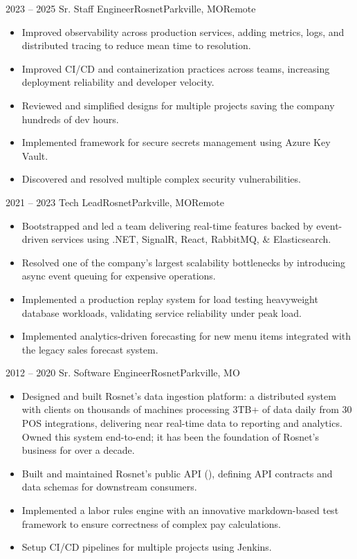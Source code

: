 \documentclass[11pt,letterpaper,final]{moderncv}
\begin{document}
	\cventry
{2023 -- 2025} {Sr. Staff Engineer}{Rosnet}{Parkville, MO}{Remote}{
		\begin{itemize}
			\item
				Improved observability across production services, adding metrics, logs,
				and distributed tracing to reduce mean time to resolution.
			\item
				Improved CI/CD and containerization practices across teams, increasing
				deployment reliability and developer velocity.
			\item
				Reviewed and simplified designs for multiple projects saving the
				company hundreds of dev hours.
			\item
				Implemented framework for secure secrets management using Azure
				Key Vault.
			\item
				Discovered and resolved multiple complex security vulnerabilities.
		\end{itemize}
}
\linebreak

	\cventry
{2021 -- 2023} {Tech Lead}{Rosnet}{Parkville, MO}{Remote}{
		\begin{itemize}
			\item
				Bootstrapped and led a team delivering real-time features backed by
				event-driven services using .NET, SignalR, React, RabbitMQ, \&
				Elasticsearch.
			\item
				Resolved one of the company's largest scalability bottlenecks by
				introducing async event queuing for expensive operations.
			\item
				Implemented a production replay system for load testing heavyweight
				database workloads, validating service reliability under peak load.
			\item
				Implemented analytics-driven forecasting for new menu items integrated
				with the legacy sales forecast system.
		\end{itemize}
}

	\cventry
{2012 -- 2020} {Sr. Software Engineer}{Rosnet}{Parkville, MO}{}{
		\begin{itemize}
			\item
				Designed and built Rosnet's data ingestion platform: a distributed system
				with clients on thousands of machines processing 3TB+ of data daily from
				30 POS integrations, delivering near real-time data to reporting and
				analytics. Owned this system end-to-end; it has been the foundation of
				Rosnet's business for over a decade.
			\item
				Built and maintained Rosnet's public API (),
				defining API contracts and data schemas for downstream consumers.
			\item
				Implemented a labor rules engine with an innovative markdown-based test
				framework to ensure correctness of complex pay calculations.
			\item
				Setup CI/CD pipelines for multiple projects using Jenkins.
		\end{itemize}
}
\linebreak
\end{document}

